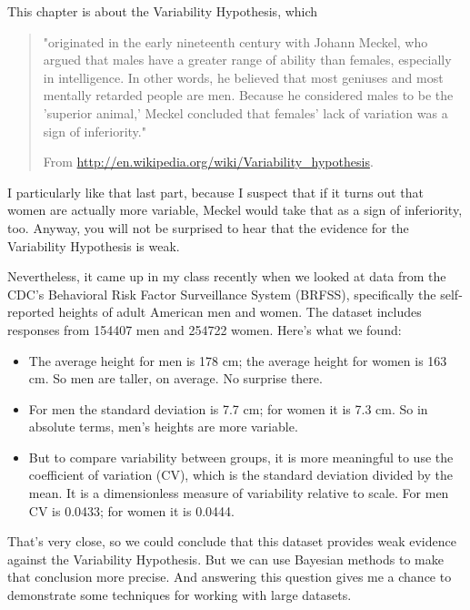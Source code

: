 \documentclass[12pt]{book}
\theoremstyle{exercise}
\begin{document}
This chapter is about the Variability Hypothesis, which

\begin{quote}
"originated in the early nineteenth century with Johann Meckel, who
  argued that males have a greater range of ability than females,
  especially in intelligence. In other words, he believed that most
  geniuses and most mentally retarded people are men. Because he
  considered males to be the 'superior animal,' Meckel concluded that
  females' lack of variation was a sign of inferiority."

From \url{http://en.wikipedia.org/wiki/Variability_hypothesis}.
\end{quote}

I particularly like that last part, because I suspect that if it turns
out that women are actually more variable, Meckel would take that as a
sign of inferiority, too.  Anyway, you will not be surprised to hear
that the evidence for the Variability Hypothesis is weak.

Nevertheless, it came up in my class recently when we looked at data
from the CDC's Behavioral Risk Factor Surveillance System (BRFSS),
specifically the self-reported heights of adult American men and women.
The dataset includes responses from 154407 men and 254722 women.
Here's what we found:

\begin{itemize}

\item The average height for men is 178 cm; the average height for
  women is 163 cm.  So men are taller, on average.  No surprise there.

\item For men the standard deviation is 7.7 cm; for women it is 7.3
  cm.  So in absolute terms, men's heights are more variable.

\item But to compare variability between groups, it is more meaningful
  to use the coefficient of variation (CV), which is the standard
  deviation divided by the mean.  It is a dimensionless measure of
  variability relative to scale.  For men CV is 0.0433; for women it
  is 0.0444.

\end{itemize}

That's very close, so we could conclude that this dataset provides
weak evidence against the Variability Hypothesis.  But we can use
Bayesian methods to make that conclusion more precise.  And answering
this question gives me a chance to demonstrate some techniques
for working with large datasets.
\end{document}
